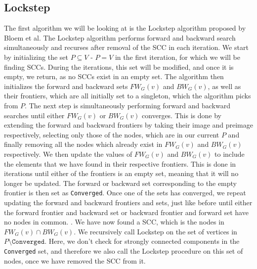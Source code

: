 \documentclass[../master/master.tex]{subfiles}
\newcommand{\FW}[2][G]{\ensuremath{FW_{#1}(#2)}}
\newcommand{\BW}[2][G]{\ensuremath{BW_{#1}(#2)}}
\begin{document}
\subsection{Lockstep}
The first algorithm we will be looking at is the Lockstep algorithm proposed by Bloem et al. \cite{lockstep} The Lockstep algorithm performs forward and backward search simultaneously and recurses after removal of the SCC in each iteration.
We start by initializing the set $P\subseteq V$ - $P=V$ in the first iteration, for which we will be finding SCCs. During the iterations, this set will be modified, and once it is empty, we return, as no SCCs exist in an empty set. The algorithm then initializes the forward and backward sets \FW{v} and \BW{v}, as well as their frontiers, which are all initially set to a singleton, which the algorithm picks from $P$.
The next step is simultaneously performing forward and backward searches until either \FW{v} or \BW{v} converges. This is done by extending the forward and backward frontiers by taking their image and preimage respectively, selecting only those of the nodes, which are in our current $P$ and finally removing all the nodes which already exist in \FW{v} and \BW{v} respectively. We then update the values of \FW{v} and \BW{v} to include the elements that we have found in their respective frontiers. This is done in iterations until either of the frontiers is an empty set, meaning that it will no longer be updated. The forward or backward set corresponding to the empty frontier is then set as \texttt{Converged}.
Once one of the sets has converged, we repeat updating the forward and backward frontiers and sets, just like before until either the forward frontier and backward set or backward frontier and forward set have no nodes in common. .
We have now found a SCC, which is the nodes in $\FW{v}\cap\BW{v}$. 
We recursively call Lockstep on the set of vertices in $P\setminus \texttt{Converged}$. Here, we don't check for strongly connected components in the \texttt{Converged} set, and therefore we also call the Lockstep procedure on this set of nodes, once we have removed the SCC from it.
\end{document}
